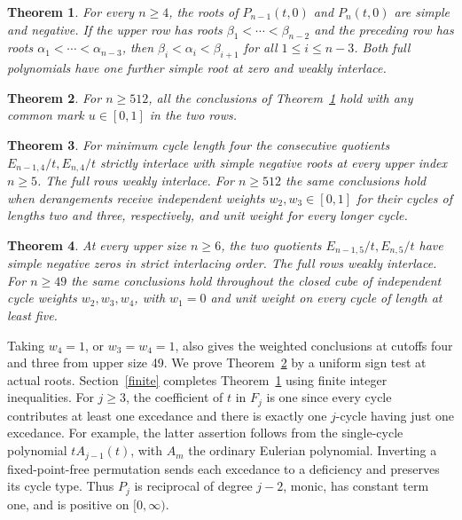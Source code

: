 \documentclass[11pt]{article}
\newtheorem{theorem}{Theorem}
\begin{document}
\begin{theorem}\label{main}
For every \(n\ge4\), the roots of \(P_{n-1}(t,0)\) and \(P_n(t,0)\) are simple and negative. If the upper row has roots \(\beta_1<\cdots<\beta_{n-2}\) and the preceding row has roots \(\alpha_1<\cdots<\alpha_{n-3}\), then \(\beta_i<\alpha_i<\beta_{i+1}\) for all \(1\le i\le n-3\). Both full polynomials have one further simple root at zero and weakly interlace.
\end{theorem}
\begin{theorem}\label{family}
For \(n\ge512\), all the conclusions of Theorem~\ref{main} hold with any common mark \(u\in[0,1]\) in the two rows.
\end{theorem}
\begin{theorem}\label{four}
For minimum cycle length four the consecutive quotients \(E_{n-1,4}/t,E_{n,4}/t\) strictly interlace with simple negative roots at every upper index \(n\ge5\). The full rows weakly interlace. For \(n\ge512\) the same conclusions hold when derangements receive independent weights \(w_2,w_3\in[0,1]\) for their cycles of lengths two and three, respectively, and unit weight for every longer cycle.
\end{theorem}
\begin{theorem}\label{five}
At every upper size \(n\ge6\), the two quotients \(E_{n-1,5}/t,E_{n,5}/t\) have simple negative zeros in strict interlacing order. The full rows weakly interlace. For \(n\ge49\) the same conclusions hold throughout the closed cube of independent cycle weights \(w_2,w_3,w_4\), with \(w_1=0\) and unit weight on every cycle of length at least five.
\end{theorem}
Taking \(w_4=1\), or \(w_3=w_4=1\), also gives the weighted conclusions at cutoffs four and three from upper size 49.
We prove Theorem~\ref{family} by a uniform sign test at actual roots. Section~\ref{finite} completes Theorem~\ref{main} using finite integer inequalities. For \(j\ge3\), the coefficient of \(t\) in \(F_j\) is one since every cycle contributes at least one excedance and there is exactly one \(j\)-cycle having just one excedance. For example, the latter assertion follows from the single-cycle polynomial \(tA_{j-1}(t)\), with \(A_m\) the ordinary Eulerian polynomial. Inverting a fixed-point-free permutation sends each excedance to a deficiency and preserves its cycle type. Thus \(P_j\) is reciprocal of degree \(j-2\), monic, has constant term one, and is positive on \([0,\infty)\).
\end{document}
